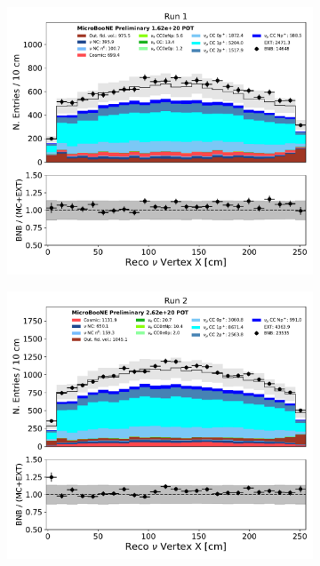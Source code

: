 \begin{figure}[hbt!] 
\begin{center}
    \begin{subfigure}[b]{0.35\textwidth}
        \centering
        \includegraphics[width=1.00\textwidth]{NuMuCCsel/Images/Ryan/Run1/reco_nu_vtx_sce_x_08072020_fullsel_samples_longest_noCRT_event_category.pdf}
    \end{subfigure}
    \begin{subfigure}[b]{0.35\textwidth}
        \centering
        \includegraphics[width=1.00\textwidth]{NuMuCCsel/Images/Ryan/Run2/reco_nu_vtx_sce_x_08072020_fullsel_samples_longest_noCRT_event_category.pdf}

\end{subfigure}
\end{center}
\end{figure}
